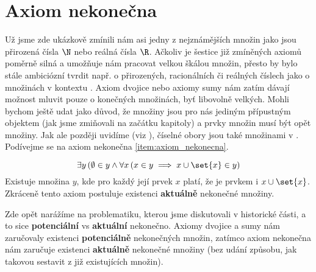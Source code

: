 \section{Axiom nekonečna}\label{sec:axiom_nekonecna}
Už jsme zde ukázkově zmínili nám asi jedny z nejznámějších množin jako jsou přirozená čísla $\N$ nebo reálná čísla $\R$. Ačkoliv je šestice již zmíněných axiomů poměrně silná a umožňuje nám pracovat velkou škálou množin, přesto by bylo stále ambiciózní tvrdit např. o přirozených, racionálních či reálných číslech jako o množinách v kontextu \ZF. Axiom dvojice nebo axiomy sumy nám zatím dávají možnost mluvit pouze o konečných množinách, byť libovolně velkých. Mohli bychom ještě udat jako důvod, že množiny jsou pro nás jediným přípustným objektem (jak jsme zmiňovali na začátku kapitoly) a prvky množin musí být opět množiny. Jak ale později uvidíme (viz ), číselné obory jsou také množinami v \ZF. Podívejme se na axiom nekonečna \ref{item:axiom_nekonecna}.
\medskip

\begin{equation*}
    \exists y\, (\emptyset\in y \land \forall x\,(x\in y\implies x\cup\set{x}\in y)
\end{equation*}
Existuje množina $y$, kde pro každý její prvek $x$ platí, že je prvkem i $x\cup\set{x}$. Zkráceně tento axiom postuluje existenci \textbf{aktuálně} nekonečné množiny.\par
Zde opět narážíme na problematiku, kterou jsme diskutovali v historické části, a to sice \textbf{potenciální} vs \textbf{aktuální} nekonečno. Axiomy dvojice a sumy nám zaručovaly existenci \textbf{potenciálně} nekonečných množin, zatímco axiom nekonečna nám zaručuje existenci \textbf{aktuálně} nekonečné množiny (bez udání způsobu, jak takovou sestavit z již existujících množin).\par